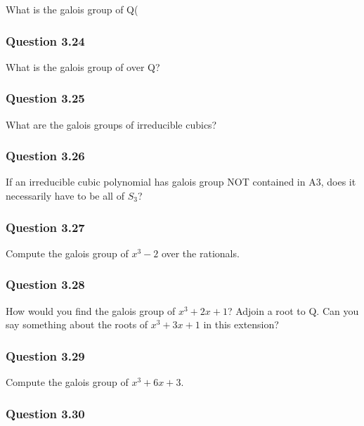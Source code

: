 What is the galois group of Q(

\hypertarget{question-3.24}{%
\subsubsection{Question 3.24}\label{question-3.24}}

What is the galois group of  over Q?

\hypertarget{question-3.25}{%
\subsubsection{Question 3.25}\label{question-3.25}}

What are the galois groups of irreducible cubics? 

\hypertarget{question-3.26}{%
\subsubsection{Question 3.26}\label{question-3.26}}

If an irreducible cubic polynomial has galois group NOT contained in A3,
does it necessarily have to be all of \(S_3\)?

\hypertarget{question-3.27}{%
\subsubsection{Question 3.27}\label{question-3.27}}

Compute the galois group of \(x^3 - 2\) over the rationals.

\hypertarget{question-3.28}{%
\subsubsection{Question 3.28}\label{question-3.28}}

How would you find the galois group of \(x^3 + 2x + 1\)? Adjoin a root
to Q. Can you say something about the roots of \(x^3 + 3x + 1\) in this
extension?

\hypertarget{question-3.29}{%
\subsubsection{Question 3.29}\label{question-3.29}}

Compute the galois group of \(x^3 + 6x + 3\).

\hypertarget{question-3.30}{%
\subsubsection{Question 3.30}\label{question-3.30}}

